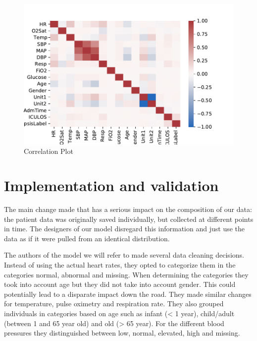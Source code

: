 \documentclass[10pt,letterpaper]{article}
\begin{document}
\begin{figure}[htpb!]
    \centering
    \includegraphics[scale = 0.7]{corr_plot.pdf}
    \caption{Correlation Plot}
    \label{fig:corr_plot}
\end{figure}

\section*{Implementation and validation}


\par The main change made that has a serious impact on the composition of our data: the patient data was originally saved individually, but collected at different points in time. The designers of our model disregard this information and just use the data as if it were pulled from an identical distribution.

\par The authors of the model we will refer to made several data cleaning decisions. Instead of using the actual heart rates, they opted to categorize them in the categories normal, abnormal and missing. When determining the categories they took into account age but they did not take into account gender. This could potentially lead to a disparate impact down the road. They made similar changes for temperature, pulse oximetry and respiration rate. They also grouped individuals in categories based on age such as infant (< 1 year), child/adult (between 1 and 65 year old) and old (> 65 year). For the different blood pressures they distinguished between low, normal, elevated, high and missing.
\end{document}
